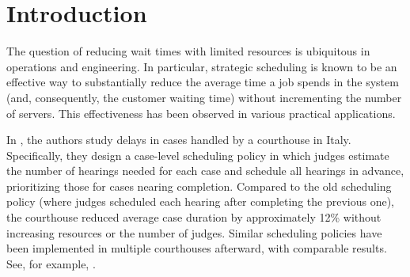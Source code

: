 \documentclass[acmsmall]{acmart}
\begin{document}


\maketitle
\fancyfoot{}
\section{Introduction}




The question of reducing wait times with limited resources is ubiquitous in operations and engineering. In particular, strategic scheduling is known to be an effective way to substantially reduce the average time a job spends in the system (and, consequently, the customer waiting time) without incrementing the number of servers. This effectiveness has been observed in various practical applications.

In \cite{bray2016courthouse}, the authors study delays in cases handled by a courthouse in Italy. Specifically, they design a case-level scheduling policy in which judges estimate the number of hearings needed for each case and schedule all hearings in advance, prioritizing those for cases nearing completion. Compared to the old scheduling policy (where judges scheduled each hearing after completing the previous one), the courthouse reduced average case duration by approximately 12\% without increasing resources or the number of judges. Similar scheduling policies have been implemented in multiple courthouses afterward, with comparable results. See, for example, \cite{azaria2023TOC,azaria2024jerusalem-courthouse}.
\end{document}
